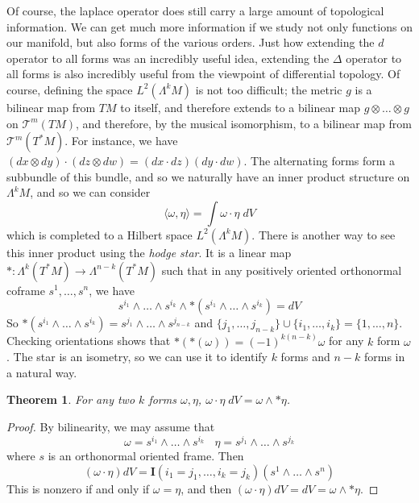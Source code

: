 \documentclass{article}
\theoremstyle{plain}
\newtheorem{theorem}{Theorem}
\theoremstyle{remark}
\theoremstyle{definition}
\begin{document}
Of course, the laplace operator does still carry a large amount of topological information. We can get much more information if we study not only functions on our manifold, but also forms of the various orders. Just how extending the $d$ operator to all forms was an incredibly useful idea, extending the $\Delta$ operator to all forms is also incredibly useful from the viewpoint of differential topology. Of course, defining the space $L^2(\Lambda^k M)$ is not too difficult; the metric $g$ is a bilinear map from $TM$ to itself, and therefore extends to a bilinear map $g \otimes \dots \otimes g$ on $\mathcal{T}^m(TM)$, and therefore, by the musical isomorphism, to a bilinear map from $\mathcal{T}^m(T^*M)$. For instance, we have $(dx \otimes dy) \cdot (dz \otimes dw) = (dx \cdot dz) (dy \cdot dw)$. The alternating forms form a subbundle of this bundle, and so we naturally have an inner product structure on $\Lambda^k M$, and so we can consider
%
\[ \langle \omega, \eta \rangle = \int \omega \cdot \eta\; dV \]
%
which is completed to a Hilbert space $L^2(\Lambda^k M)$. There is another way to see this inner product using the {\it hodge star}. It is a linear map $*: \Lambda^k(T^*M) \to \Lambda^{n-k}(T^*M)$ such that in any positively oriented orthonormal coframe $s^1, \dots, s^n$, we have
%
\[ s^{i_1} \wedge \dots \wedge s^{i_k} \wedge *(s^{i_1} \wedge \dots \wedge s^{i_k}) = dV \]
%
So $*(s^{i_1} \wedge \dots \wedge s^{i_k}) = s^{j_1} \wedge \dots \wedge s^{j_{n-k}}$ and $\{ j_1, \dots, j_{n-k} \} \cup \{ i_1, \dots, i_k \} = \{ 1, \dots, n \}$. Checking orientations shows that $*(*(\omega)) = (-1)^{k(n-k)} \omega$ for any $k$ form $\omega$. The star is an isometry, so we can use it to identify $k$ forms and $n-k$ forms in a natural way.

\begin{theorem}
    For any two $k$ forms $\omega, \eta$, $\omega \cdot \eta\; dV = \omega \wedge *\eta$.
\end{theorem}
\begin{proof}
    By bilinearity, we may assume that
    \[ \omega = s^{i_1} \wedge \dots \wedge s^{i_k}\ \ \ \ \eta = s^{j_1} \wedge \dots \wedge s^{j_k} \]
    where $s$ is an orthonormal oriented frame. Then
    \[ (\omega \cdot \eta) dV = \mathbf{I}(i_1 = j_1, \dots, i_k = j_k) (s^1 \wedge \dots \wedge s^n) \]
    This is nonzero if and only if $\omega = \eta$, and then $(\omega \cdot \eta) dV = dV = \omega \wedge *\eta$.
\end{proof}
\end{document}
